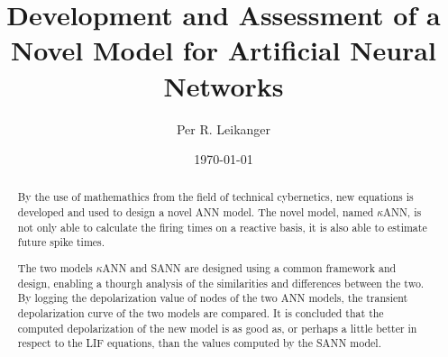 \documentclass[b5paper,11 pt]{report}
\author{Per R. Leikanger}
\title{Development and Assessment of a Novel Model for Artificial Neural Networks}
\date{\today}
\begin{document}
   




\maketitle

\begin{abstract}

By the use of mathemathics from the field of technical cybernetics, new equations is developed and used to design a novel ANN model. 
The novel model, named $\kappa$ANN, is not only able to calculate the firing times on a reactive basis, it is also able to estimate future spike times.

The two models $\kappa$ANN and SANN are designed using a common framework and design, enabling a thourgh analysis of the similarities and differences between the two.
By logging the depolarization value of nodes of the two ANN models, the transient depolarization curve of the two models are compared.
%
%
It is concluded that the computed depolarization of the new model is as good as, or perhaps a little better in respect to the LIF equations, than the values computed by the SANN model.


\end{abstract}
\end{document}
